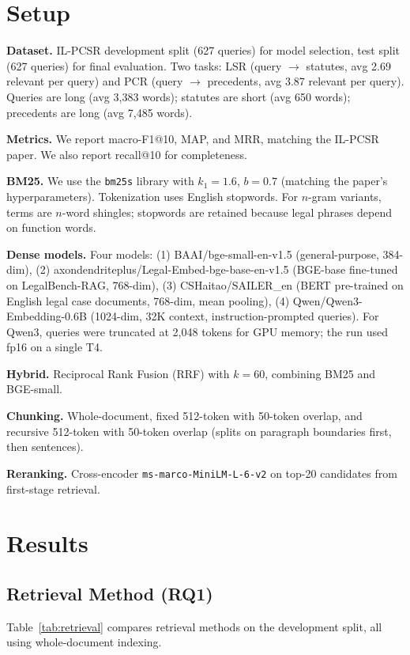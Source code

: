 \documentclass[11pt]{article}
\begin{document}
\section{Setup}

\textbf{Dataset.} IL-PCSR development split (627 queries) for model selection, test split (627 queries) for final evaluation. Two tasks: LSR (query $\to$ statutes, avg 2.69 relevant per query) and PCR (query $\to$ precedents, avg 3.87 relevant per query). Queries are long (avg 3{,}383 words); statutes are short (avg 650 words); precedents are long (avg 7{,}485 words).

\textbf{Metrics.} We report macro-F1@10, MAP, and MRR, matching the IL-PCSR paper. We also report recall@10 for completeness.

\textbf{BM25.} We use the \texttt{bm25s} library with $k_1=1.6$, $b=0.7$ (matching the paper's hyperparameters). Tokenization uses English stopwords. For $n$-gram variants, terms are $n$-word shingles; stopwords are retained because legal phrases depend on function words.

\textbf{Dense models.} Four models: (1) BAAI/bge-small-en-v1.5 (general-purpose, 384-dim), (2) axondendriteplus/Legal-Embed-bge-base-en-v1.5 (BGE-base fine-tuned on LegalBench-RAG, 768-dim), (3) CSHaitao/SAILER\_en (BERT pre-trained on English legal case documents, 768-dim, mean pooling), (4) Qwen/Qwen3-Embedding-0.6B (1024-dim, 32K context, instruction-prompted queries). For Qwen3, queries were truncated at 2{,}048 tokens for GPU memory; the run used fp16 on a single T4.

\textbf{Hybrid.} Reciprocal Rank Fusion (RRF) with $k=60$, combining BM25 and BGE-small.

\textbf{Chunking.} Whole-document, fixed 512-token with 50-token overlap, and recursive 512-token with 50-token overlap (splits on paragraph boundaries first, then sentences).

\textbf{Reranking.} Cross-encoder \texttt{ms-marco-MiniLM-L-6-v2} on top-20 candidates from first-stage retrieval.

\section{Results}

\subsection{Retrieval Method (RQ1)}

Table~\ref{tab:retrieval} compares retrieval methods on the development split, all using whole-document indexing.
\end{document}
